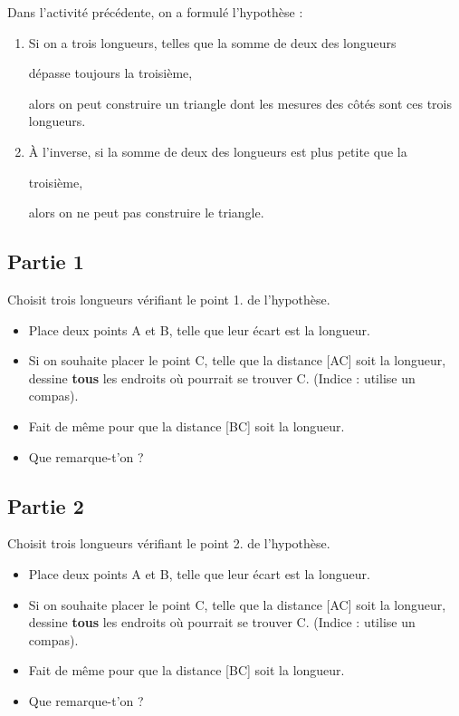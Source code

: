 \documentclass[a4paper,12pt]{article}
\newcommand{\correction}[1]{{\color{red}#1}}
\newcommand{\correction}[1]{\dotfill}
\begin{document}
\maketitle

Dans l'activité précédente, on a formulé l'hypothèse :

\begin{hypothese}
	\begin{enumerate}
		\item Si on a trois longueurs, telles que \correction{la somme de deux des longueurs}

		      \correction{dépasse toujours la troisième},

		      alors on peut construire un triangle dont les mesures des côtés sont ces trois longueurs.
		\item À l'inverse, si \correction{la somme de deux des longueurs est plus petite que la}

		      \correction{troisième},

		      alors on ne peut pas construire le triangle.
	\end{enumerate}
\end{hypothese}


\subsection*{Partie 1}

Choisit trois longueurs vérifiant le point 1. de l'hypothèse.

\begin{itemize}
	\item Place deux points A et B, telle que leur écart est la  longueur.
	\item Si on souhaite placer le point C, telle que la distance [AC] soit la  longueur, dessine \textbf{tous} les endroits où pourrait se trouver C. (Indice : utilise un compas).
	\item Fait de même pour que la distance [BC] soit la  longueur.
	\item Que remarque-t'on ?
\end{itemize}

\subsection*{Partie 2}

Choisit trois longueurs vérifiant le point 2. de l'hypothèse.

\begin{itemize}
	\item Place deux points A et B, telle que leur écart est la  longueur.
	\item Si on souhaite placer le point C, telle que la distance [AC] soit la  longueur, dessine \textbf{tous} les endroits où pourrait se trouver C. (Indice : utilise un compas).
	\item Fait de même pour que la distance [BC] soit la  longueur.
	\item Que remarque-t'on ?
\end{itemize}
\end{document}
